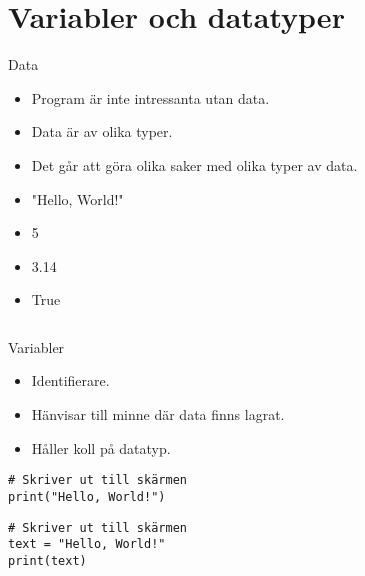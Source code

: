 \begin{frame}[fragile]
  \inputminted[highlightlines={14,20,22,27-28},linenos,firstline=11]{python}{examples/age.py}
\end{frame}


\section{Variabler och datatyper}

\begin{frame}
  \begin{block}{Data}
    \begin{itemize}
      \item Program är inte intressanta utan data.
      \item Data är av olika typer.
      \item Det går att göra olika saker med olika typer av data.
    \end{itemize}
  \end{block}

  \pause

  \begin{example}[Litteraler]
    \begin{itemize}
      \item "Hello, World!"
      \item 5
      \item 3.14
      \item True
    \end{itemize}
  \end{example}
\end{frame}

\begin{frame}[fragile]
  \inputminted[highlightlines={11-12,14,17,20,22,25,27-28},linenos,firstline=11]{python}{examples/age.py}
\end{frame}

\begin{frame}[fragile]
  \begin{block}{Variabler}
    \begin{itemize}
      \item Identifierare.
      \item Hänvisar till minne där data finns lagrat.
      \item Håller koll på datatyp.
    \end{itemize}
  \end{block}

  \pause

  \begin{example}
    \begin{verbatim}
# Skriver ut till skärmen
print("Hello, World!")
    \end{verbatim}
  \end{example}

  \begin{example}
    \begin{verbatim}
# Skriver ut till skärmen
text = "Hello, World!"
print(text)
    \end{verbatim}
  \end{example}
\end{frame}

